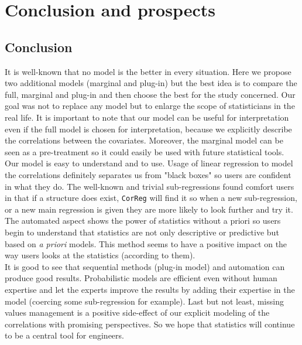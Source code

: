 \documentclass[12pt,a4paper]{report}
\begin{document}
\chapter{Conclusion and prospects}
	\section{Conclusion}
		It is well-known that no model is the better in every situation. Here we propose two additional models (marginal and plug-in) but the best idea is to compare the full, marginal and plug-in and then choose the best for the study concerned. Our goal was not to replace any model but to enlarge the scope of statisticians in the real life. It is important to note that our model can be useful for interpretation even if the full model is chosen for interpretation, because we explicitly describe the correlations between the covariates. Moreover, the marginal model can be seen as a pre-treatment so it could easily be used with future statistical tools. \\
		
		Our model is easy to understand and to use. Usage of linear regression to model the correlations definitely separates us from "black boxes" so users are confident in what they do. The well-known and trivial sub-regressions found comfort users in that if a structure does exist, {\tt CorReg} will find it so when a new sub-regression, or a new main regression is given they are more likely to look further and try it. The automated aspect shows the power of statistics without a priori so users begin to understand that statistics are not only descriptive or predictive but based on {\it a priori} models. This method seems to have a positive impact on the way users looks at the statistics (according to them). \\
		
		It is good to see that sequential methods (plug-in model) and automation can produce good results. Probabilistic models are efficient even without human expertise and let the experts improve the results by adding their expertise in the model (coercing some sub-regression for example). Last but not least, missing values management is a positive side-effect of our explicit modeling of the correlations with promising perspectives.
		 So we hope that statistics will continue to be a central tool for engineers.\\
					
\end{document}
